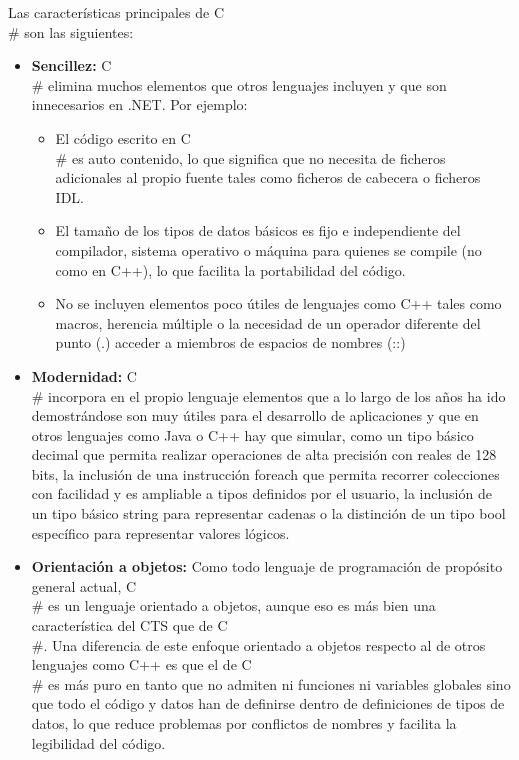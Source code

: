 Las caracter\'isticas principales de C\\# son las siguientes:
\begin{itemize}
	\item \textbf{Sencillez:} C\\# elimina muchos elementos que otros lenguajes incluyen y que son innecesarios en .NET. Por ejemplo: 
		\begin{itemize}
			\item El c\'odigo escrito en C\\# es auto contenido, lo que significa que no necesita de ficheros adicionales al propio fuente tales como ficheros de cabecera o ficheros IDL.
			\item El tama\~no de los tipos de datos b\'asicos es fijo e independiente del compilador, sistema operativo o m\'aquina para quienes se compile (no como en C++), lo que facilita la portabilidad del c\'odigo.
			\item No se incluyen elementos poco \'utiles de lenguajes como C++ tales como macros, herencia m\'ultiple o la necesidad de un operador diferente del punto (.) acceder a miembros de espacios de nombres (::) 
		\end{itemize}
		\item \textbf{Modernidad: } C\\# incorpora en el propio lenguaje elementos que a lo largo de los a\~nos ha ido demostr\'andose son muy \'utiles para el desarrollo de aplicaciones y que en otros lenguajes como Java o C++ hay que simular, como un tipo b\'asico decimal que permita realizar operaciones de alta precisi\'on con reales de 128 bits, la inclusi\'on de una instrucci\'on foreach que permita recorrer colecciones con facilidad y es ampliable a tipos definidos por el usuario, la inclusi\'on de un tipo b\'asico string para representar cadenas o la distinci\'on de un tipo bool espec\'ifico para representar valores l\'ogicos. 
		
		\item \textbf{Orientaci\'on a objetos: }Como todo lenguaje de programaci\'on de prop\'osito general actual, C\\# es un lenguaje orientado a objetos, aunque eso es m\'as bien una caracter\'istica del CTS que de C\\#. Una diferencia de este enfoque orientado a objetos respecto al de otros lenguajes como C++ es que el de C\\# es m\'as puro en tanto que no admiten ni funciones ni variables globales sino que todo el c\'odigo y datos han de definirse dentro de definiciones de tipos de datos, lo que reduce problemas por conflictos de nombres y facilita la legibilidad del c\'odigo.\\


\end{itemize}
